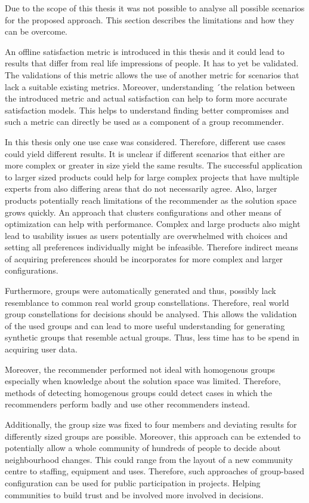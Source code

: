 Due to the scope of this thesis it was not possible to analyse all possible scenarios for the proposed approach. This section describes the limitations and how they can be overcome.

An offline satisfaction metric is introduced in this thesis and it could lead to results that differ from real life impressions of people. It has to yet be validated. The validations of this metric allows the use of another metric for scenarios that lack a suitable existing metrics. Moreover, understanding ´the relation between the introduced metric and actual satisfaction can help to form more accurate satisfaction models. This helps to understand finding better compromises and such a metric can directly be used as a component of a group recommender.

In this thesis only one use case was considered. Therefore, different use cases could yield different results. It is unclear if different scenarios that either are more complex or greater in size yield the same results. The successful application to larger sized products could help for large complex projects that have multiple experts from also differing areas that do not necessarily agree. Also, larger products potentially reach limitations of the recommender as the solution space grows quickly. An approach that clusters configurations and other means of optimization can help with performance. Complex and large products also might lead to usability issues as users potentially are overwhelmed with choices and setting all preferences individually might be infeasible. Therefore indirect means of acquiring preferences should be incorporates for more complex and larger configurations. 

Furthermore, groups were automatically generated and thus, possibly lack resemblance to common real world group constellations. Therefore, real world group constellations for decisions should be analysed. This allows the validation of the used groups and can lead to more useful understanding for generating synthetic groups that resemble actual groups. Thus, less time has to be spend in acquiring user data.

Moreover, the recommender performed not ideal with homogenous groups especially when knowledge about the solution space was limited. Therefore, methods of detecting homogenous groups could detect cases in which the recommenders perform badly and use other recommenders instead.

Additionally, the group size was fixed to four members and deviating results for differently sized groups are possible. Moreover, this approach can be extended to potentially allow a whole community of hundreds of people to decide about neighbourhood changes. This could range from the layout of a new community centre to staffing, equipment and uses. Therefore, such approaches of group-based configuration can be used for public participation in projects. Helping communities to build trust and be involved more involved in decisions.

